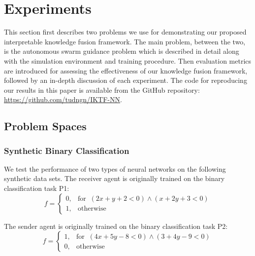 \documentclass[lettersize,journal]{IEEEtran}
\begin{document}
\section{Experiments}\label{jpaper2-experiments}

This section first describes two problems we use for demonstrating our proposed interpretable knowledge fusion framework. The main problem, between the two, is the autonomous swarm guidance problem which is described in detail along with the simulation environment and training procedure. Then evaluation metrics are introduced for assessing the effectiveness of our knowledge fusion framework, followed by an in-depth discussion of each experiment. The code for reproducing our results in this paper is available from the GitHub repository: \url{https://github.com/tudngn/IKTF-NN}.

\subsection{Problem Spaces}
\subsubsection{Synthetic Binary Classification}\label{jpaper2-experiments-integration}
We test the performance of two types of neural networks on the following synthetic data sets. The receiver agent is originally trained on the binary classification task P1:
\begin{equation}
f = \begin{cases}
        0, & \mbox{for} \;\; (2x+y+2<0) \land (x+2y+3<0) \\
        1, & \mbox{otherwise}
    \end{cases}
\label{eq:P1}
\end{equation}

The sender agent is originally trained on the binary classification task P2:
\begin{equation}
f = \begin{cases}
        1, & \mbox{for} \;\; (4x+5y-8<0) \land (3+4y-9<0) \\
        0, & \mbox{otherwise}
    \end{cases}
\label{eq:P2}
\end{equation}
\end{document}
